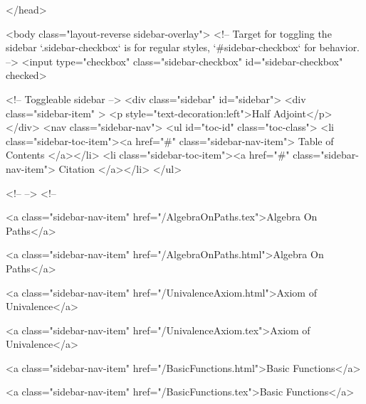   
</head>




  <body class="layout-reverse sidebar-overlay">
    <!-- Target for toggling the sidebar `.sidebar-checkbox` is for regular
     styles, `#sidebar-checkbox` for behavior. -->
<input type="checkbox" class="sidebar-checkbox" id="sidebar-checkbox" checked>

<!-- Toggleable sidebar -->
<div class="sidebar" id="sidebar">
  <div class="sidebar-item" >
    <p style="text-decoration:left">Half Adjoint</p>
  </div>
  <nav class="sidebar-nav">
    <ul id="toc-id" class="toc-class">
  <li class="sidebar-toc-item"><a href="#" class="sidebar-nav-item"> Table of Contents </a></li>
  <li class="sidebar-toc-item"><a href="#" class="sidebar-nav-item"> Citation </a></li>
</ul>


    <!--  -->
    <!-- 
      
    
      
    
      
    
      
        
      
    
      
        
          <a class="sidebar-nav-item" href="/AlgebraOnPaths.tex">Algebra On Paths</a>
        
      
    
      
        
          <a class="sidebar-nav-item" href="/AlgebraOnPaths.html">Algebra On Paths</a>
        
      
    
      
        
          <a class="sidebar-nav-item" href="/UnivalenceAxiom.html">Axiom of Univalence</a>
        
      
    
      
        
          <a class="sidebar-nav-item" href="/UnivalenceAxiom.tex">Axiom of Univalence</a>
        
      
    
      
        
          <a class="sidebar-nav-item" href="/BasicFunctions.html">Basic Functions</a>
        
      
    
      
        
          <a class="sidebar-nav-item" href="/BasicFunctions.tex">Basic Functions</a>
        
      
    
